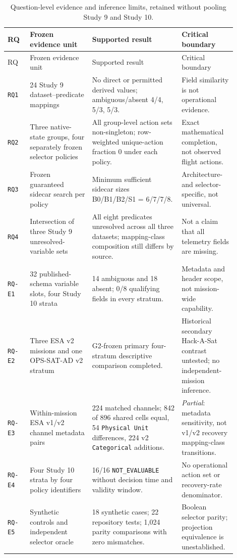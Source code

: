 \documentclass[preprint,12pt]{elsarticle}
\begin{document}
\begingroup
\scriptsize
\setlength{\tabcolsep}{3pt}
\renewcommand{\arraystretch}{1.20}
\begin{longtable}{@{}p{0.09\linewidth}p{0.25\linewidth}p{0.36\linewidth}p{0.20\linewidth}@{}}
\caption{Question-level evidence and inference limits, retained without pooling Study 9 and Study 10.}\label{tab:phase2rq}\\
\toprule RQ & Frozen evidence unit & Supported result & Critical boundary \\
\midrule
\endfirsthead
\toprule RQ & Frozen evidence unit & Supported result & Critical boundary \\
\midrule
\endhead
\texttt{RQ1} & 24 Study 9 dataset--predicate mappings & No direct or permitted derived values; ambiguous/absent 4/4, 5/3, 5/3. & Field similarity is not operational evidence. \\
\texttt{RQ2} & Three native-state groups, four separately frozen selector policies & All group-level action sets non-singleton; row-weighted unique-action fraction 0 under each policy. & Exact mathematical completion, not observed flight actions. \\
\texttt{RQ3} & Frozen guaranteed sidecar search per policy & Minimum sufficient sidecar sizes B0/B1/B2/S1 = 6/7/7/8. & Architecture- and selector-specific, not universal. \\
\texttt{RQ4} & Intersection of three Study 9 unresolved-variable sets & All eight predicates unresolved across all three datasets; mapping-class composition still differs by source. & Not a claim that all telemetry fields are missing. \\
\texttt{RQ-E1} & 32 published-schema variable slots, four Study 10 strata & 14 ambiguous and 18 absent; 0/8 qualifying fields in every stratum. & Metadata and header scope, not mission-wide capability. \\
\texttt{RQ-E2} & Three ESA v2 missions and one OPS-SAT-AD v2 stratum & G2-frozen primary four-stratum descriptive comparison completed. & Historical secondary Hack-A-Sat contrast untested; no independent-mission inference. \\
\texttt{RQ-E3} & Within-mission ESA v1/v2 channel metadata pairs & 224 matched channels; 842 of 896 shared cells equal, 54 \texttt{Physical Unit} differences, 224 v2 \texttt{Categorical} additions. & \emph{Partial}: metadata sensitivity, not v1/v2 recovery mapping-class transitions. \\
\texttt{RQ-E4} & Four Study 10 strata by four policy identifiers & 16/16 \texttt{NOT\_EVALUABLE} without decision time and validity window. & No operational action set or recovery-rate denominator. \\
\texttt{RQ-E5} & Synthetic controls and independent selector oracle & 18 synthetic cases; 22 repository tests; 1,024 parity comparisons with zero mismatches. & Boolean selector parity; projection equivalence is unestablished. \\
\bottomrule
\end{longtable}
\endgroup
\end{document}
